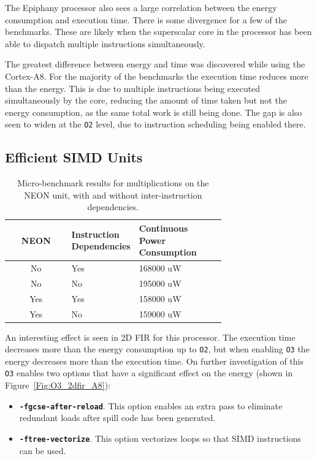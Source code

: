 \documentclass[twocolumn]{article}
\let\oldcaption\caption
\renewcommand{\caption}[1]{\oldcaption{\textup{#1}}}
\begin{document}
The Epiphany processor also sees a large correlation between the energy consumption and execution time. There is some divergence for a few of the benchmarks. These are likely when the superscalar core in the processor has been able to dispatch multiple instructions simultaneously.

The greatest difference between energy and time was discovered while using the Cortex-A8. For the majority of the benchmarks the execution time reduces more than the energy. This is due to multiple instructions being executed simultaneously by the core, reducing the amount of time taken but not the energy consumption, as the same total work is still being done. The gap is also seen to widen at the \texttt{O2} level, due to instruction scheduling being enabled there.

\subsection{Efficient SIMD Units}

\begin{table}
	\centering
	\begin{tabular}{c p{0.3\linewidth} p{0.4\linewidth}}
		\bfseries NEON & \bfseries Instruction Dependencies & \bfseries Continuous Power Consumption \\
		\hline
		No & \centering Yes & {\hspace{0.85cm} 168000 uW } \\
		No & \centering No & {\hspace{0.85cm} 195000 uW } \\
		Yes & \centering Yes & {\hspace{0.85cm} 158000 uW } \\
		Yes & \centering No & {\hspace{0.85cm} 159000 uW } \\
	\end{tabular}
	\caption{Micro-benchmark results for multiplications on the NEON unit, with and without inter-instruction dependencies.}
	\label{Table:SIMD}
\end{table}

An interesting effect is seen in 2D FIR for this processor. The execution time decreases more than the energy consumption up to \texttt{O2}, but when enabling \texttt{O3} the energy decreases more than the execution time. On further investigation of this \texttt{O3} enables two options that have a significant effect on the energy (shown in Figure~\ref{Fig:O3_2dfir_A8}):
\begin{itemize}
	\item \texttt{\bfseries -fgcse-after-reload}. This option enables an extra pass to eliminate redundant loads after spill code has been generated.
	\item \texttt{\bfseries -ftree-vectorize}. This option vectorizes loops so that SIMD instructions can be used.
\end{itemize}
\end{document}
